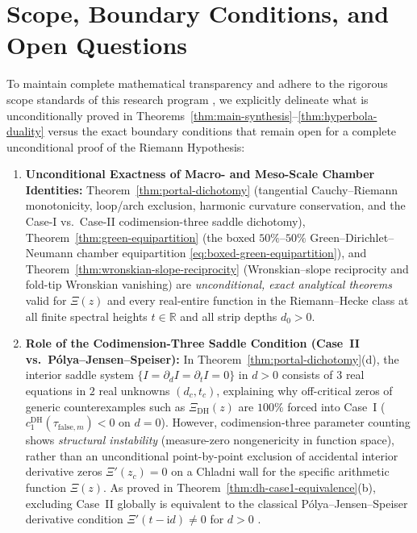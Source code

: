 \documentclass[11pt,reqno]{amsart}
\theoremstyle{definition}
\theoremstyle{remark}
\numberwithin{equation}{section}
\newcommand{\ii}{\mathrm{i}}
\newcommand{\DHf}{\mathrm{DH}}
\begin{document}
\section{Scope, Boundary Conditions, and Open Questions}\label{sec:scope}

To maintain complete mathematical transparency and adhere to the rigorous scope standards of this research program \cite{Bombieri2000,Edwards1974,Titchmarsh1986}, we explicitly delineate what is unconditionally proved in Theorems~\ref{thm:main-synthesis}--\ref{thm:hyperbola-duality} versus the exact boundary conditions that remain open for a complete unconditional proof of the Riemann Hypothesis:
\begin{enumerate}[label=\upshape(\arabic*),leftmargin=2.2em]
\item \textbf{Unconditional Exactness of Macro- and Meso-Scale Chamber Identities:} Theorem~\ref{thm:portal-dichotomy} (tangential Cauchy--Riemann monotonicity, loop/arch exclusion, harmonic curvature conservation, and the Case-I vs.\ Case-II codimension-three saddle dichotomy), Theorem~\ref{thm:green-equipartition} (the boxed $50\%$--$50\%$ Green--Dirichlet--Neumann chamber equipartition \eqref{eq:boxed-green-equipartition}), and Theorem~\ref{thm:wronskian-slope-reciprocity} (Wronskian--slope reciprocity and fold-tip Wronskian vanishing) are \emph{unconditional, exact analytical theorems} valid for $\Xi(z)$ and every real-entire function in the Riemann--Hecke class at all finite spectral heights $t \in \mathbb{R}$ and all strip depths $d_0 > 0$.
\item \textbf{Role of the Codimension-Three Saddle Condition (Case~II vs.\ P\'{o}lya--Jensen--Speiser):} In Theorem~\ref{thm:portal-dichotomy}(d), the interior saddle system $\{I=\partial_d I=\partial_t I=0\}$ in $d>0$ consists of $3$ real equations in $2$ real unknowns $(d_c,t_c)$, explaining why off-critical zeros of generic counterexamples such as $\Xi_{\DHf}(z)$ are $100\%$ forced into Case~I ($c_1^{\DHf}(\tau_{\mathrm{false},m}) < 0$ on $d=0$). However, codimension-three parameter counting shows \emph{structural instability} (measure-zero nongenericity in function space), rather than an unconditional point-by-point exclusion of accidental interior derivative zeros $\Xi'(z_c)=0$ on a Chladni wall for the specific arithmetic function $\Xi(z)$. As proved in Theorem~\ref{thm:dh-case1-equivalence}(b), excluding Case~II globally is equivalent to the classical P\'{o}lya--Jensen--Speiser derivative condition $\Xi'(t-\ii d) \ne 0$ for $d > 0$ \cite{Jensen1913,Polya1926,Speiser1934}.

\end{enumerate}
\end{document}
